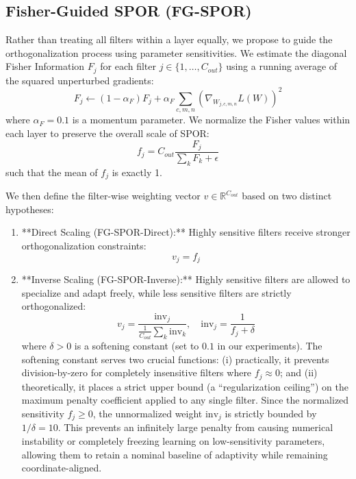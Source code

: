 \documentclass{article}
\theoremstyle{plain}
\theoremstyle{definition}
\theoremstyle{remark}
\begin{document}
\subsection{Fisher-Guided SPOR (FG-SPOR)}
Rather than treating all filters within a layer equally, we propose to guide the orthogonalization process using parameter sensitivities. We estimate the diagonal Fisher Information $F_j$ for each filter $j \in \{1, \dots, C_{out}\}$ using a running average of the squared unperturbed gradients:
\begin{equation}
    F_j \leftarrow (1 - \alpha_F) F_j + \alpha_F \sum_{c, m, n} (\nabla_{W_{j,c,m,n}} L(W))^2
\end{equation}
where $\alpha_F = 0.1$ is a momentum parameter. We normalize the Fisher values within each layer to preserve the overall scale of SPOR:
\begin{equation}
    f_j = C_{out} \frac{F_j}{\sum_k F_k + \epsilon}
\end{equation}
such that the mean of $f_j$ is exactly 1. 

We then define the filter-wise weighting vector $v \in \mathbb{R}^{C_{out}}$ based on two distinct hypotheses:
\begin{enumerate}
    \item **Direct Scaling (FG-SPOR-Direct):** Highly sensitive filters receive stronger orthogonalization constraints:
    \begin{equation}
        v_j = f_j
    \end{equation}
    \item **Inverse Scaling (FG-SPOR-Inverse):** Highly sensitive filters are allowed to specialize and adapt freely, while less sensitive filters are strictly orthogonalized:
    \begin{equation}
        v_j = \frac{\text{inv}_j}{\frac{1}{C_{out}} \sum_k \text{inv}_k}, \quad \text{inv}_j = \frac{1}{f_j + \delta}
    \end{equation}
    where $\delta > 0$ is a softening constant (set to $0.1$ in our experiments). The softening constant serves two crucial functions: (i) practically, it prevents division-by-zero for completely insensitive filters where $f_j \approx 0$; and (ii) theoretically, it places a strict upper bound (a ``regularization ceiling'') on the maximum penalty coefficient applied to any single filter. Since the normalized sensitivity $f_j \geq 0$, the unnormalized weight $\text{inv}_j$ is strictly bounded by $1/\delta = 10$. This prevents an infinitely large penalty from causing numerical instability or completely freezing learning on low-sensitivity parameters, allowing them to retain a nominal baseline of adaptivity while remaining coordinate-aligned.
\end{enumerate}
\end{document}
